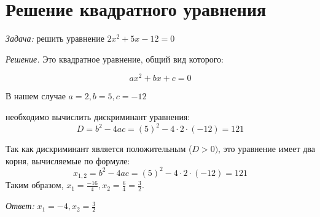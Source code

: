 \documentclass{article}
\begin{document}
\section{Решение квадратного уравнения}

\textit {Задача:} решить уравнение $2x^2 + 5x - 12 = 0$

\textit {Решение.} Это квадратное уравнение, общий вид которого:

\[ ax^2 + bx + c= 0 \]

В нашем случае $a = 2, b = 5, c = -12$

 необходимо вычислить дискриминант уравнения:
\[D = b^2 - 4ac = (5)^2 - 4 \cdot 2 \cdot (-12) = 121\]

Так как дискриминант является положительным ($D > 0)$, это уравнение
имеет два корня, вычисляемые по формуле:
\[x_{1,2} = b^2 - 4ac = (5)^2 - 4 \cdot 2 \cdot (-12) = 121\]
Таким образом, $x_1 = \frac{-16}{4} , x_2 = \frac{6}{4} = \frac{3}{2}.$

\quad \textit{Ответ:} $x_1 = -4, x_2 = \frac{3}{2}$
\end{document}
